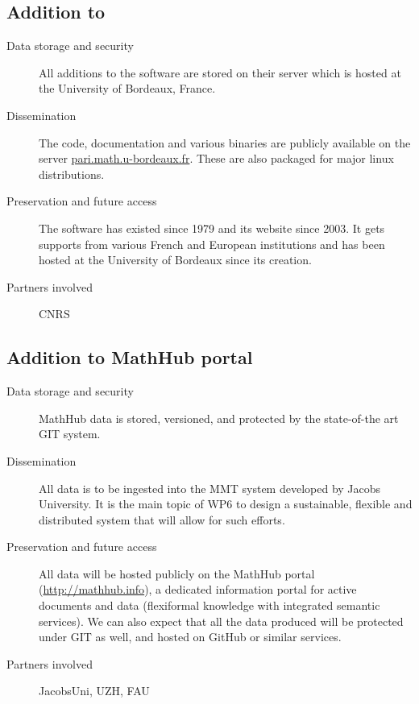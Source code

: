 \documentclass{deliverablereport}
\begin{document}
\subsection{Addition to \PariGP}

\begin{description}
\item[Data storage and security] All additions to the \PariGP software are stored on their server which is hosted at the University of Bordeaux, France.
\item[Dissemination] The \PariGP code, documentation and various binaries are publicly available on the server \href{http://pari.math.u-bordeaux.fr/}{pari.math.u-bordeaux.fr}. These are also packaged for major linux distributions.
\item[Preservation and future access] The \PariGP software has existed
  since 1979 and its website since 2003. It gets supports from various
  French and European institutions and has been hosted at the University of Bordeaux since its creation.
\item[Partners involved] CNRS
\end{description}


\subsection{Addition to MathHub portal}


\begin{description}
\item[Data storage and security] MathHub data is stored, versioned, and protected by the
state-of-the art GIT system.
\item[Dissemination] All data is to be ingested into the MMT system developed by Jacobs University. It is the main topic of WP6 to design a sustainable, flexible and distributed system that will allow for such efforts.
\item[Preservation and future access] All data will be hosted publicly on the MathHub portal (\url{http://mathhub.info}), a
dedicated information portal for active documents and data (flexiformal knowledge with
integrated semantic services). We can also expect that all the data produced will be protected under GIT as well, and hosted on GitHub or similar services. 
\item[Partners involved] JacobsUni, UZH, FAU
\end{description}
\end{document}
